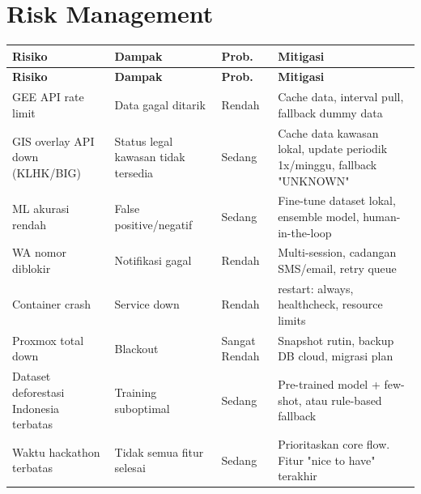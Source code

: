 \documentclass[11pt,a4paper]{article}
\begin{document}
\section{Risk Management}

\begin{longtable}{p{2.5cm} p{2.5cm} p{2cm} p{5cm}}
    \toprule
    \textbf{Risiko} & \textbf{Dampak} & \textbf{Prob.} & \textbf{Mitigasi} \\
    \midrule
    \endfirsthead
    \toprule
    \textbf{Risiko} & \textbf{Dampak} & \textbf{Prob.} & \textbf{Mitigasi} \\
    \midrule
    \endhead
    \hline
    \endfoot
    \bottomrule
    \endlastfoot

    GEE API rate limit & Data gagal ditarik & Rendah & Cache data, interval pull, fallback dummy data \\

    GIS overlay API \newline down (KLHK/BIG) & Status legal kawasan tidak tersedia & Sedang & Cache data kawasan lokal, update periodik 1x/minggu, fallback "UNKNOWN" \\

    ML akurasi rendah & False positive/negatif & Sedang & Fine-tune dataset lokal, ensemble model, human-in-the-loop \\

    WA nomor diblokir & Notifikasi gagal & Rendah & Multi-session, cadangan SMS/email, retry queue \\

    Container crash & Service down & Rendah & restart: always, healthcheck, resource limits \\

    Proxmox total down & Blackout & Sangat Rendah & Snapshot rutin, backup DB cloud, migrasi plan \\

    Dataset deforestasi Indonesia terbatas & Training suboptimal & Sedang & Pre-trained model + few-shot, atau rule-based fallback \\

    Waktu hackathon terbatas & Tidak semua fitur selesai & Sedang & Prioritaskan core flow. Fitur "nice to have" terakhir \\

\end{longtable}

\end{document}
